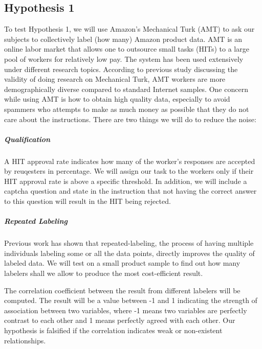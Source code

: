 \documentclass[dvips,12pt]{article}
\begin{document}
\subsection{Hypothesis 1}
To test Hypothesis 1, we will use Amazon’s Mechanical Turk (AMT) to ask our subjects to collectively label (how many) Amazon product data. AMT is an online labor market that allows one to outsource small tasks (HITs) to a large pool of workers for relatively low pay. The system has been used extensively under different research topics. According to previous study discussing the validity of doing research on Mechanical Turk\cite{buhrmester2011amazon}, AMT workers are more demographically diverse compared to standard Internet samples.
One concern while using AMT is how to obtain high quality data, especially to avoid spammers who attempts to make as much money as possible that they do not care about the instructions. There are two things we will do to reduce the noise:
	
 \subparagraph{Qualification}
	 A HIT approval rate indicates how many of the worker’s responses are accepted by reuqesters in percentage. We will assign our task to the workers only if their HIT approval rate is above a specific threshold. In addition, we will include a captcha question and state in the instruction that not having the correct answer to this question will result in the HIT being rejected.
	 
\subparagraph{Repeated Labeling}
	 Previous work has shown that repeated-labeling, the process of having multiple individuals labeling some or all the data points, directly improves the quality of labeled data\cite{sheng2008get}. We will test on a small product sample to find out how many labelers shall we allow to produce the most cost-efficient result.\newline
	 
\noindent The correlation coefficient between the result from different labelers will be computed. The result will be a value between -1 and 1 indicating the strength of association between two variables, where -1 means two variables are perfectly contrast to each other and 1 means perfectly agreed with each other. Our hypothesis is falsified if the correlation indicates weak or non-existent relationships.


	
\end{document}
